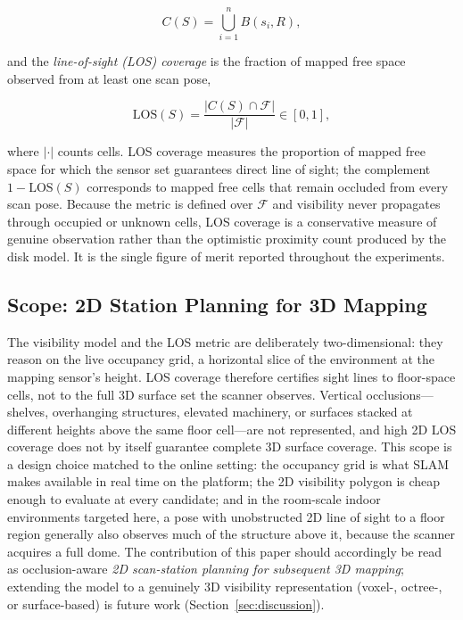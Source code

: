 \documentclass[sensors,article,submit,pdftex,moreauthors]{Definitions/mdpi}
\providecommand{\DIFadd}[1]{{\protect\color{blue} \sf #1}} %
\providecommand{\DIFaddbegin}{} %
\begin{document}
\begin{equation}
C(S)=\bigcup_{i=1}^{n} B(s_i,R),
\end{equation}

and the \emph{line-of-sight (LOS) coverage} is the fraction of mapped free space
observed from at least one scan pose,

\begin{equation}
\mathrm{LOS}(S)=\frac{\lvert C(S)\cap\mathcal{F}\rvert}{\lvert\mathcal{F}\rvert}\in[0,1],
\end{equation}

where $\lvert\cdot\rvert$ counts cells. LOS coverage measures the proportion of
mapped free space for which the sensor set guarantees direct line of sight; the
complement $1-\mathrm{LOS}(S)$ corresponds to mapped free cells that remain
occluded from every scan pose. Because the metric is defined over $\mathcal{F}$
and visibility never propagates through occupied or unknown cells, LOS coverage
is a conservative measure of genuine observation rather than the optimistic
proximity count produced by the disk model. It is the single figure of merit
reported throughout the experiments.

\DIFaddbegin \subsection{\DIFadd{Scope: 2D Station Planning for 3D Mapping}}
\label{sec:scope2d}

\DIFadd{The visibility model and the LOS metric are deliberately two-dimensional: they
reason on the live occupancy grid, a horizontal slice of the environment at the
mapping sensor's height. LOS coverage therefore certifies sight lines to
floor-space cells, not to the full 3D surface set the scanner observes.
Vertical occlusions---shelves, overhanging structures, elevated machinery, or
surfaces stacked at different heights above the same floor cell---are not
represented, and high 2D LOS coverage does not by itself guarantee complete 3D
surface coverage. This scope is a design choice matched to the online setting:
the occupancy grid is what SLAM makes available in real time on the platform;
the 2D visibility polygon is cheap enough to evaluate at every candidate; and
in the room-scale indoor environments targeted here, a pose with unobstructed
2D line of sight to a floor region generally also observes much of the
structure above it, because the scanner acquires a full dome. The contribution
of this paper should accordingly be read as occlusion-aware \emph{2D
scan-station planning for subsequent 3D mapping}; extending the model to a
genuinely 3D visibility representation (voxel-, octree-, or surface-based) is
future work (Section~\ref{sec:discussion}).
}
\end{document}
